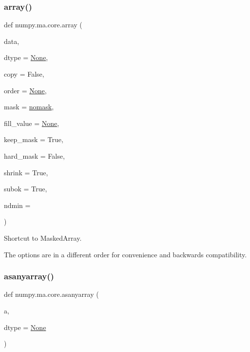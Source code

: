 \mbox{\label{namespacenumpy_1_1ma_1_1core_ae4c7868c066019a67e77b8e3015595ab}} 
\subsubsection{\texorpdfstring{array()}{array()}}
{\footnotesize\ttfamily def numpy.\+ma.\+core.\+array (\begin{DoxyParamCaption}\item[{}]{data,  }\item[{}]{dtype = {\ttfamily \hyperlink{namespacenumpy_1_1ma_1_1core_a647ee1848dfa3692fe35a663a2aa40b3}{None}},  }\item[{}]{copy = {\ttfamily False},  }\item[{}]{order = {\ttfamily \hyperlink{namespacenumpy_1_1ma_1_1core_a647ee1848dfa3692fe35a663a2aa40b3}{None}},  }\item[{}]{mask = {\ttfamily \hyperlink{namespacenumpy_1_1ma_1_1core_abafbbb38c7afc60936cc5a55fa23ecfa}{nomask}},  }\item[{}]{fill\+\_\+value = {\ttfamily \hyperlink{namespacenumpy_1_1ma_1_1core_a647ee1848dfa3692fe35a663a2aa40b3}{None}},  }\item[{}]{keep\+\_\+mask = {\ttfamily True},  }\item[{}]{hard\+\_\+mask = {\ttfamily False},  }\item[{}]{shrink = {\ttfamily True},  }\item[{}]{subok = {\ttfamily True},  }\item[{}]{ndmin = {} }\end{DoxyParamCaption})}

\begin{DoxyVerb}Shortcut to MaskedArray.

The options are in a different order for convenience and backwards
compatibility.\end{DoxyVerb}
 \mbox{\label{namespacenumpy_1_1ma_1_1core_a3fb0819beec8848fbb8910d05b72ef4e}} 
\subsubsection{\texorpdfstring{asanyarray()}{asanyarray()}}
{\footnotesize\ttfamily def numpy.\+ma.\+core.\+asanyarray (\begin{DoxyParamCaption}\item[{}]{a,  }\item[{}]{dtype = {\ttfamily \hyperlink{namespacenumpy_1_1ma_1_1core_a647ee1848dfa3692fe35a663a2aa40b3}{None}} }\end{DoxyParamCaption})}

